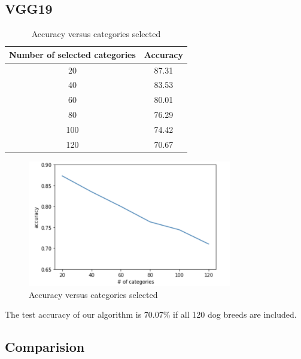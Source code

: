 \documentclass{article}
\begin{document}
\subsection{VGG19}
\begin{table}[h]
	\centering
	
	\begin{tabular}{|c|c|}
		\hline
		Number of selected categories & Accuracy \\\hline
		20 & 87.31\\
		40 & 83.53\\
		60 & 80.01\\
		80 & 76.29\\
		100 & 74.42\\
		120 & 70.67\\
		\hline
	\end{tabular}
\caption{Accuracy versus categories selected}
\end{table}
\begin{figure}[H]
	\centering
	\includegraphics[width=3.5in]{pics/vgg19_1} 
	\caption{Accuracy versus categories selected}
\end{figure}
The test accuracy of our algorithm is 70.07\% if all 120 dog breeds are included. 
\subsection{Comparision}

\newpage
\end{document}
